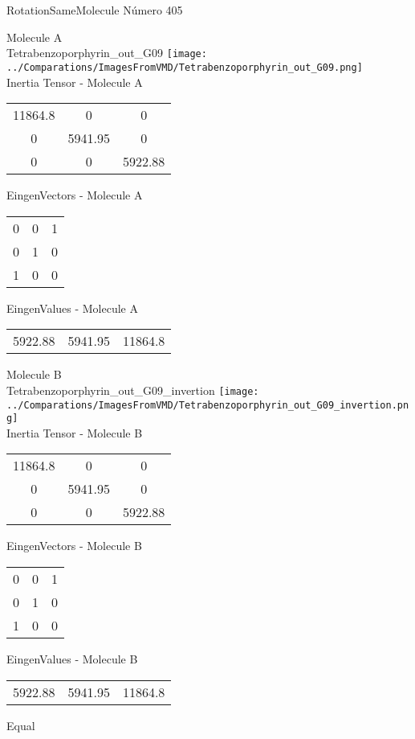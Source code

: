 \vtab[-2cm]
\begin{center}
{\large RotationSameMolecule \tab Número 405}
\end{center}
\begin{multicols}{2}
\begin{center}

Molecule A \\ 
Tetrabenzoporphyrin\_out\_G09
\texttt{[image: ../Comparations/ImagesFromVMD/Tetrabenzoporphyrin\_out\_G09.png]}
\\
Inertia Tensor - Molecule A \\
\vtab

\begin{tabular}{|c c c|}
11864.8	 & 	0	 & 	0	 \\
0	 & 	5941.95	 & 	0	 \\
0	 & 	0	 & 	5922.88
\end{tabular}

\vtab
 EingenVectors - Molecule A     \\
\vtab
\begin{tabular}{|c c c|}
0	 & 	0	 & 	1	 \\
0	 & 	1	 & 	0	 \\
1	 & 	0	 & 	0
\end{tabular}

\vtab
 EingenValues - Molecule A     \\
\vtab
\begin{tabular}{|c c c|}
5922.88	 & 	5941.95	 & 	11864.8	 \\
\end{tabular}
\columnbreak

Molecule B \\ 
Tetrabenzoporphyrin\_out\_G09\_invertion
\texttt{[image: ../Comparations/ImagesFromVMD/Tetrabenzoporphyrin\_out\_G09\_invertion.png]}
\\
Inertia Tensor - Molecule B \\
\vtab

\begin{tabular}{|c c c|}
11864.8	 & 	0	 & 	0	 \\
0	 & 	5941.95	 & 	0	 \\
0	 & 	0	 & 	5922.88
\end{tabular}

\vtab
 EingenVectors - Molecule B     \\
\vtab
\begin{tabular}{|c c c|}
0	 & 	0	 & 	1	 \\
0	 & 	1	 & 	0	 \\
1	 & 	0	 & 	0
\end{tabular}

\vtab
 EingenValues - Molecule B     \\
\vtab
\begin{tabular}{|c c c|}
5922.88	 & 	5941.95	 & 	11864.8	 \\
\end{tabular}

\end{center}
\end{multicols}
\begin{center}
\vtab
\vtab
\textcolor{NavyBlue}{\Large Equal}
\end{center}

